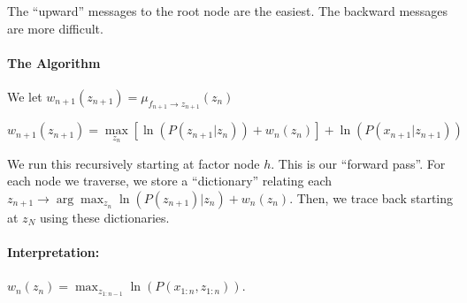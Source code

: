 \documentclass[a4paper,12pt]{report}
\begin{document}
The ``upward'' messages to the root node are the easiest. The backward messages are more difficult.

\paragraph{The Algorithm} 

We let $w_{n+1}(z_{n+1}) = \mu_{f_{n+1} \to z_{n+1}}(z_n)$

\begin{equation}
w_{n+1}(z_{n+1}) = \max_{z_n} [\ln( P(z_{n+1} | z_n)) + w_n(z_n) ] + \ln(P(x_{n+1} | z_{n+1}))
\end{equation}

We run this recursively starting at factor node $h$. This is our ``forward pass''. For each node we traverse, we store a ``dictionary'' relating each $z_{n+1}\to \arg \max_{z_n} \ln(P(z_{n+1}) | z_n) + w_n(z_n)$. Then, we trace back starting at $z_N$ using these dictionaries.

\paragraph{Interpretation: } $w_n(z_n)= \max_{z_{1:n-1}} \ln(P(x_{1:n}, z_{1:n}))$. 
\end{document}

